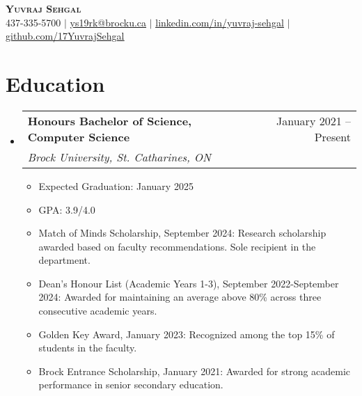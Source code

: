 \documentclass[letterpaper,11pt]{article}
\makeatletter
\newcommand{\resumeItem}[1]{
  \item\small{
    {#1 \vspace{-2pt}}
  }
}
\newcommand{\resumeSubheading}[4]{
  \vspace{-2pt}\item
    \begin{tabular*}{0.97\textwidth}[t]{l@{\extracolsep{\fill}}r}
      \textbf{#1} & #2 \\
      \textit{\small#3} & \textit{\small #4} \\
    \end{tabular*}\vspace{-7pt}
}
\newcommand{\resumeSubHeadingListStart}{\begin{itemize}[leftmargin=0.15in, label={}]}
\newcommand{\resumeSubHeadingListEnd}{\end{itemize}}
\newcommand{\resumeItemListStart}{\begin{itemize}}
\newcommand{\resumeItemListEnd}{\end{itemize}\vspace{-5pt}}
\makeatother
\begin{document}
\begin{center}
    \textbf{\Large \scshape Yuvraj Sehgal}\\
    \small 437-335-5700 $|$ \href{mailto:ys19rk@brocku.ca4}{\underline{ys19rk@brocku.ca}} $|$ \href{https://ca.linkedin.com/in/yuvraj-sehgal}{\underline{linkedin.com/in/yuvraj-sehgal}} $|$ \href{https://github.com/17YuvrajSehgal}{\underline{github.com/17YuvrajSehgal}}
\end{center}

\section{Education}
\resumeSubHeadingListStart
  \resumeSubheading
    {Honours Bachelor of Science, Computer Science}{January 2021 -- Present}
    {Brock University, St. Catharines, ON}{}
    \resumeItemListStart
      \resumeItem{Expected Graduation:}{January 2025}
      \resumeItem{GPA:}{3.9/4.0}
      \resumeItem{Match of Minds Scholarship, September 2024:}{Research scholarship awarded based on faculty recommendations. Sole recipient in the department.}
      \resumeItem{Dean's Honour List (Academic Years 1-3), September 2022-September 2024:}{Awarded for maintaining an average above 80\% across three consecutive academic years.}
      \resumeItem{Golden Key Award, January 2023:}{Recognized among the top 15\% of students in the faculty.}
      \resumeItem{Brock Entrance Scholarship, January 2021:}{Awarded for strong academic performance in senior secondary education.}
    \resumeItemListEnd
\resumeSubHeadingListEnd




\end{document}
